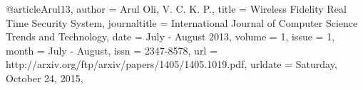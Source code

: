 @article{Arul13,
	author = {Arul Oli, V. C. K. P.},
	title = {Wireless Fidelity Real Time Security System},
	journaltitle = {International Journal of Computer Science Trends and Technology},
	date = {July - August 2013},
	volume = {1},
	issue = {1},
	month = {July - August},
	issn = {2347-8578},
	url = {http://arxiv.org/ftp/arxiv/papers/1405/1405.1019.pdf},
	urldate = {Saturday, October 24, 2015},
}
